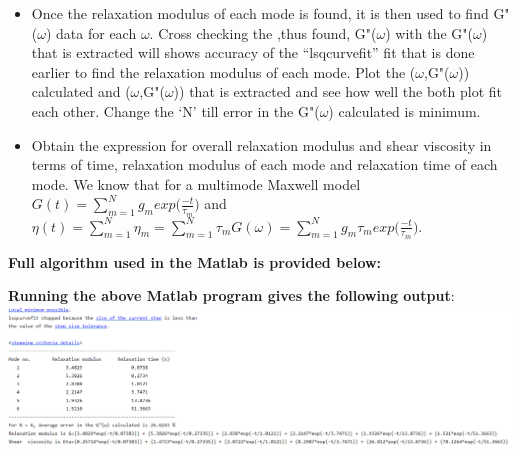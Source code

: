 \documentclass[a4paper,12pt]{report}
\begin{document}
\begin{itemize}
    \item Once the relaxation modulus of each mode is found, it is then used to find G"($\omega$) data for each $\omega$. Cross checking the ,thus found, G"($\omega$) with the G"($\omega$) that is extracted will shows accuracy of the ``lsqcurvefit'' fit that is done earlier to find the relaxation modulus of each mode. Plot the ($\omega$,G"($\omega$)) calculated and ($\omega$,G"($\omega$)) that is extracted and see how well the both plot fit each other. Change the `N' till error in the G"($\omega$) calculated is minimum.
    \item Obtain the expression for overall relaxation modulus and shear viscosity in terms of time, relaxation modulus of each mode and relaxation time of each mode. We know that for a multimode Maxwell model $G(t)=\sum_{m=1}^N g_m exp\big(\frac{-t}{\tau_m}\big)$ and $\eta(t)=\sum_{m=1}^N\eta_m=\sum_{m=1}^N\tau_mG(\omega)=\sum_{m=1}^N g_m\tau_mexp\big(\frac{-t}{\tau_m}\big)$.
\end{itemize}
\textbf{Full algorithm used in the Matlab is provided below:}

\noindent
\textbf{Running the above Matlab program gives the following output}:\\
\includegraphics[scale=0.8]{Results.png}
\end{document}
